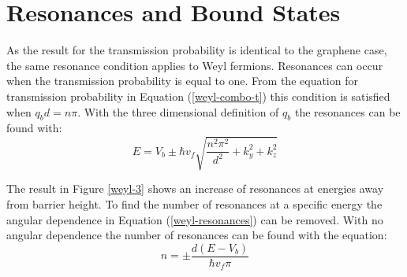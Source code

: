 		\section{Resonances and Bound States}
		\label{weyl - Resonances and Bound States}
			As the result for the transmission probability is identical to the graphene case, the same resonance condition applies to Weyl fermions. Resonances can occur when the transmission probability is equal to one. From the equation for transmission probability in Equation (\ref{weyl-combo-t}) this condition is satisfied when $q_{b}d=n\pi$. With the three dimensional definition of $q_{b}$ the resonances can be found with:
			\begin{equation}
				E=V_{b}\pm\hbar v_{f}\sqrt{\frac{n^{2}\pi^{2}}{d^{2}}+k_{y}^{2}+k_{z}^{2}}
				\label{weyl-resonances}
			\end{equation}

			The result in Figure \ref{weyl-3} shows an increase of resonances at energies away from barrier height. To find the number of resonances at a specific energy the angular dependence in Equation (\ref{weyl-resonances}) can be removed. With no angular dependence the number of resonances can be found with the equation:
			\begin{equation}
				n=\pm\frac{d\left(E-V_{b}\right)}{\hbar v_{f}\pi}
			\end{equation}

